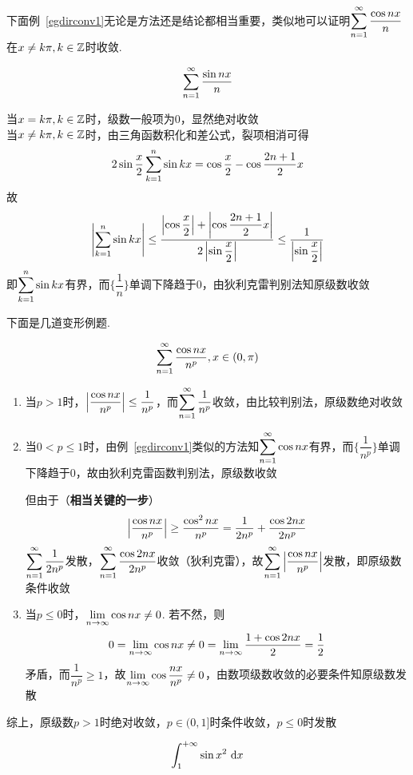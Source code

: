 \par 下面例~\ref{egdirconv1}无论是方法还是结论都相当重要，类似地可以证明$\displaystyle\sum_{n=1}^{\infty}\dfrac{\cos nx}{n}$在$x\neq k\pi,k\in\mathbb{Z}$时收敛.
\begin{example}
\[\displaystyle\sum_{n=1}^{\infty}\dfrac{\sin nx}{n}\]
\label{egdirconv1}
\end{example}
\begin{analysis}
当$x=k\pi,k\in\mathbb{Z}$时，级数一般项为$0$，显然绝对收敛\\
当$x\neq k\pi,k\in\mathbb{Z}$时，由三角函数积化和差公式，裂项相消可得
\[2\sin\dfrac{x}{2}\displaystyle\sum_{k=1}^{n}\sin kx=\cos\dfrac{x}{2}-\cos\dfrac{2n+1}{2}x\]
故
\[\left|\displaystyle\sum_{k=1}^{n}\sin kx\right|\leq\dfrac{\left|\cos\dfrac{x}{2}\right|+\left|\cos\dfrac{2n+1}{2}x\right|}{2\left|\sin\dfrac{x}{2}\right|}\leq\dfrac{1}{\left|\sin\dfrac{x}{2}\right|}\]
即$\displaystyle\sum_{k=1}^{n}\sin kx$有界，而$\{\dfrac{1}{n}\}$单调下降趋于$0$，由狄利克雷判别法知原级数收敛
\end{analysis}
\par 下面是几道变形例题.
\begin{example}
\[\displaystyle\sum_{n=1}^{\infty}\frac{\cos nx}{n^p},x\in(0,\pi)\]
\end{example}
\begin{analysis}
\begin{enumerate}
	\item 当$p>1$时，$\left|\dfrac{\cos nx}{n^p}\right|\leq\dfrac{1}{n^p}$，而$\displaystyle\sum_{n=1}^{\infty}\dfrac{1}{n^p}$收敛，由比较判别法，原级数绝对收敛\par
	\item 当$0<p\leq 1$时，由例~\ref{egdirconv1}类似的方法知$\displaystyle\sum_{n=1}^{\infty}\cos nx$有界，而$\{\dfrac{1}{n^p}\}$单调下降趋于$0$，故由狄利克雷函数判别法，原级数收敛\par
但由于（\textbf{相当关键的一步}）
\[\left|\dfrac{\cos nx}{n^p}\right|\geq\dfrac{\cos^2 nx}{n^p}=\dfrac{1}{2n^p}+\dfrac{\cos 2nx}{2n^p}\]
$\displaystyle\sum_{n=1}^{\infty}\dfrac{1}{2n^p}$发散，$\displaystyle\sum_{n=1}^{\infty}\dfrac{\cos 2nx}{2n^p}$收敛（狄利克雷），故$\displaystyle\sum_{n=1}^{\infty}\left|\dfrac{\cos nx}{n^p}\right|$发散，即原级数条件收敛\par
	\item 当$p\leq 0$时，$\displaystyle\lim_{n\to\infty}\cos nx\neq 0$. 若不然，则
\[0=\displaystyle\lim_{n\to\infty}\cos nx\neq 0=\displaystyle\lim_{n\to\infty}\dfrac{1+\cos 2nx}{2}=\dfrac{1}{2}\]
矛盾，而$\dfrac{1}{n^p}\geq 1$，故$\displaystyle\lim_{n\to\infty}\cos\dfrac{nx}{n^p}\neq 0$，由数项级数收敛的必要条件知原级数发散
\end{enumerate}
综上，原级数$p>1$时绝对收敛，$p\in(0,1]$时条件收敛，$p\leq 0$时发散
\end{analysis}
\begin{example}
\label{countereg_conver_integ}
\[\displaystyle\int_{1}^{+\infty}{\sin x^2}\,\,\mathrm{d} x\]
\end{example}

